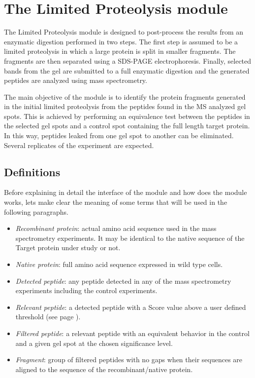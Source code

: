 \chapter{The Limited Proteolysis module}
\label{chap:limprot}

The Limited Proteolysis module is designed to post-process the results from an enzymatic digestion performed in two steps. The first step is assumed to be a limited proteolysis in which a large protein is split in smaller fragments. The fragments are then separated using a SDS-PAGE electrophoresis. Finally, selected bands from the gel are submitted to a full enzymatic digestion and the generated peptides are analyzed using mass spectrometry.

The main objective of the module is to identify the protein fragments generated in the initial limited proteolysis from the peptides found in the MS analyzed gel spots. This is achieved by performing an equivalence test\cite{Limentani2005} between the peptides in the selected gel spots and a control spot containing the full length target protein. In this way, peptides leaked from one gel spot to another can be eliminated. Several replicates of the experiment are expected.

\section{Definitions}
\label{sec:limprotDefinitions}

Before explaining in detail the interface of the module and how does the module works, lets make clear the meaning of some terms that will be used in the following paragraphs.

\begin{itemize}
	\item \textit{Recombinant protein}: actual amino acid sequence used in the mass spectrometry experiments. It may be identical to the native sequence of the Target protein under study or not.
	\item \textit{Native protein}: full amino acid sequence expressed in wild type cells.
	\item \textit{Detected peptide}: any peptide detected in any of the mass spectrometry experiments including the control experiments.
	\item \textit{Relevant peptide}: a detected peptide with a Score value above a user defined threshold (see page \pageref{par:limprotScoreValue}).
	\item \textit{Filtered peptide}: a relevant peptide with an equivalent behavior in the control and a given gel spot at the chosen significance level.\label{par:limprotFP}
	\item \textit{Fragment}: group of filtered peptides with no gaps when their sequences are aligned to the sequence of the recombinant/native protein. 
\end{itemize}

